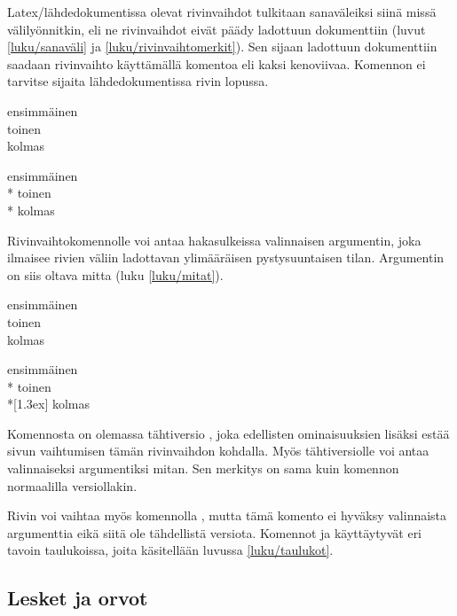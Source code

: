 Latex\-/lähdedokumentissa olevat rivinvaihdot tulkitaan sanaväleiksi
siinä missä välilyönnitkin, eli ne rivinvaihdot eivät päädy ladottuun
dokumenttiin (luvut \ref{luku/sanaväli} ja
\ref{luku/rivinvaihtomerkit}). Sen sijaan ladottuun dokumenttiin saadaan
rivinvaihto käyttämällä komentoa \komentom{\keno} eli kaksi kenoviivaa.
Komennon ei tarvitse sijaita lähdedokumentissa rivin lopussa.

\komentoi{\keno}
\begin{koodilohkosis}
ensimmäinen \\ toinen \\
kolmas
\end{koodilohkosis}

\begin{tulossis}
  ensimmäinen \\* toinen \\* kolmas
\end{tulossis}

\noindent
Rivinvaihtokomennolle voi antaa hakasulkeissa valinnaisen argumentin,
joka ilmaisee rivien väliin ladottavan ylimääräisen pystysuuntaisen
tilan. Argumentin on siis oltava mitta (luku \ref{luku/mitat}).

\komentoi{\keno}
\begin{koodilohkosis}
ensimmäinen \\ toinen \\[1.3ex] kolmas
\end{koodilohkosis}

\begin{tulossis}
  ensimmäinen \\* toinen \\*[1.3ex] kolmas
\end{tulossis}

\noindent
Komennosta on olemassa tähtiversio \komentom{\keno *}, joka edellisten
ominaisuuksien lisäksi estää sivun vaihtumisen tämän rivinvaihdon
kohdalla. Myös tähtiversiolle voi antaa valinnaiseksi argumentiksi
mitan. Sen merkitys on sama kuin komennon normaalilla versiollakin.

Rivin voi vaihtaa myös komennolla , mutta tämä komento
ei hyväksy valinnaista argumenttia eikä siitä ole tähdellistä versiota.
Komennot  ja \komento{\keno} käyttäytyvät eri tavoin
taulukoissa, joita käsitellään luvussa \ref{luku/taulukot}.

\subsection{Lesket ja orvot}

